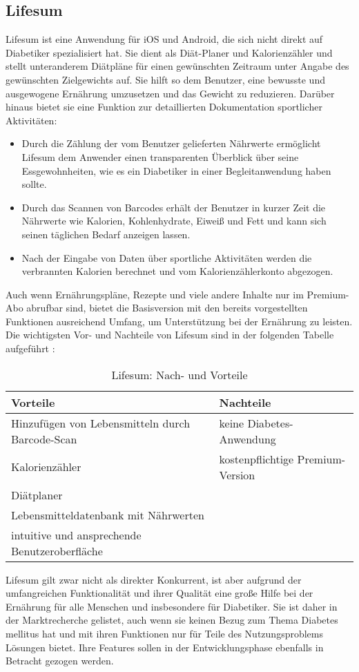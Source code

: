 	\subsection{Lifesum}
	Lifesum ist eine Anwendung für iOS und Android, die sich nicht direkt auf Diabetiker spezialisiert hat. Sie dient als Diät-Planer und Kalorienzähler und stellt unteranderem Diätpläne für einen gewünschten Zeitraum unter Angabe des gewünschten Zielgewichts auf. Sie hilft so dem Benutzer, eine bewusste und ausgewogene Ernährung umzusetzen und das Gewicht zu reduzieren. Darüber hinaus bietet sie eine Funktion zur detaillierten Dokumentation sportlicher Aktivitäten:
	\begin{itemize}
		\item Durch die Zählung der vom Benutzer gelieferten Nährwerte ermöglicht Lifesum dem Anwender einen transparenten Überblick über seine Essgewohnheiten, wie es ein Diabetiker in einer Begleitanwendung haben sollte. 
		\item Durch das Scannen von Barcodes erhält der Benutzer in kurzer Zeit die Nährwerte wie Kalorien, Kohlenhydrate, Eiweiß und Fett und kann sich seinen täglichen Bedarf anzeigen lassen.
		\item Nach der Eingabe von Daten über sportliche Aktivitäten werden die verbrannten Kalorien berechnet und vom Kalorienzählerkonto abgezogen.
	\end{itemize}
	Auch wenn Ernährungspläne, Rezepte und viele andere Inhalte nur im Premium-Abo abrufbar sind, bietet die Basisversion mit den bereits vorgestellten Funktionen ausreichend Umfang, um Unterstützung bei der Ernährung zu leisten. Die wichtigsten Vor- und Nachteile von Lifesum sind in der folgenden Tabelle aufgeführt \cite{L}:
	\begin{table}[H]
		\setlength{\tabcolsep}{12pt}
		\centering
		\begin{tabular}{p{6cm}|p{6cm}}
			\toprule
			\textbf{Vorteile} & \textbf{Nachteile}\\
			\hline
			Hinzufügen von Lebensmitteln durch Barcode-Scan & keine Diabetes-Anwendung\\
			\hline
			Kalorienzähler & kostenpflichtige Premium-Version\\
			\hline
			Diätplaner & \\
			\hline
			Lebensmitteldatenbank mit Nährwerten & \\
			\hline
			intuitive und ansprechende Benutzeroberfläche & \\
			\bottomrule
		\end{tabular}
		\captionsetup{justification=centering}
		\caption{Lifesum: Nach- und Vorteile}
		\label{tab:Lifesum}
	\end{table}
	\setlength{\parindent}{0pt}Lifesum gilt zwar nicht als direkter Konkurrent, ist aber aufgrund der umfangreichen Funktionalität und ihrer Qualität eine große Hilfe bei der Ernährung für alle Menschen und insbesondere für Diabetiker. Sie ist daher in der Marktrecherche gelistet, auch wenn sie keinen Bezug zum Thema Diabetes mellitus hat und mit ihren Funktionen nur für Teile des Nutzungsproblems Lösungen bietet. Ihre Features sollen in der Entwicklungsphase ebenfalls in Betracht gezogen werden.

